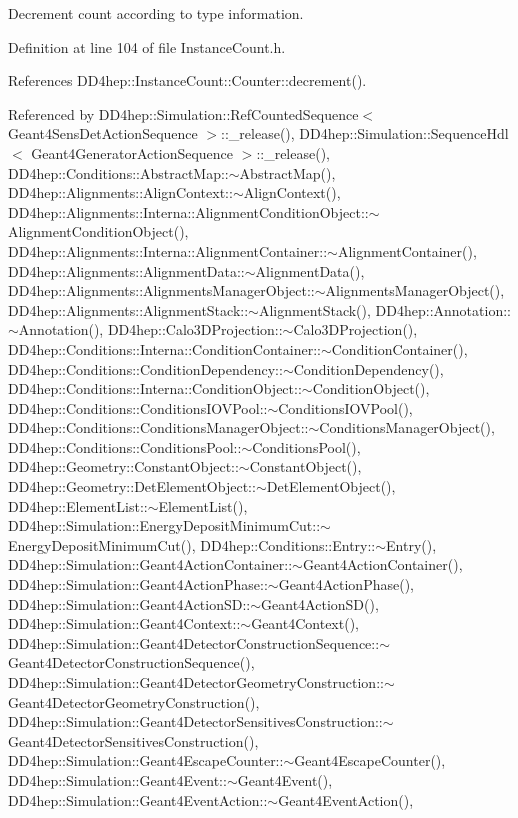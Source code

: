 Decrement count according to type information. 



Definition at line 104 of file Instance\+Count.\+h.



References D\+D4hep\+::\+Instance\+Count\+::\+Counter\+::decrement().



Referenced by D\+D4hep\+::\+Simulation\+::\+Ref\+Counted\+Sequence$<$ Geant4\+Sens\+Det\+Action\+Sequence $>$\+::\+\_\+release(), D\+D4hep\+::\+Simulation\+::\+Sequence\+Hdl$<$ Geant4\+Generator\+Action\+Sequence $>$\+::\+\_\+release(), D\+D4hep\+::\+Conditions\+::\+Abstract\+Map\+::$\sim$\+Abstract\+Map(), D\+D4hep\+::\+Alignments\+::\+Align\+Context\+::$\sim$\+Align\+Context(), D\+D4hep\+::\+Alignments\+::\+Interna\+::\+Alignment\+Condition\+Object\+::$\sim$\+Alignment\+Condition\+Object(), D\+D4hep\+::\+Alignments\+::\+Interna\+::\+Alignment\+Container\+::$\sim$\+Alignment\+Container(), D\+D4hep\+::\+Alignments\+::\+Alignment\+Data\+::$\sim$\+Alignment\+Data(), D\+D4hep\+::\+Alignments\+::\+Alignments\+Manager\+Object\+::$\sim$\+Alignments\+Manager\+Object(), D\+D4hep\+::\+Alignments\+::\+Alignment\+Stack\+::$\sim$\+Alignment\+Stack(), D\+D4hep\+::\+Annotation\+::$\sim$\+Annotation(), D\+D4hep\+::\+Calo3\+D\+Projection\+::$\sim$\+Calo3\+D\+Projection(), D\+D4hep\+::\+Conditions\+::\+Interna\+::\+Condition\+Container\+::$\sim$\+Condition\+Container(), D\+D4hep\+::\+Conditions\+::\+Condition\+Dependency\+::$\sim$\+Condition\+Dependency(), D\+D4hep\+::\+Conditions\+::\+Interna\+::\+Condition\+Object\+::$\sim$\+Condition\+Object(), D\+D4hep\+::\+Conditions\+::\+Conditions\+I\+O\+V\+Pool\+::$\sim$\+Conditions\+I\+O\+V\+Pool(), D\+D4hep\+::\+Conditions\+::\+Conditions\+Manager\+Object\+::$\sim$\+Conditions\+Manager\+Object(), D\+D4hep\+::\+Conditions\+::\+Conditions\+Pool\+::$\sim$\+Conditions\+Pool(), D\+D4hep\+::\+Geometry\+::\+Constant\+Object\+::$\sim$\+Constant\+Object(), D\+D4hep\+::\+Geometry\+::\+Det\+Element\+Object\+::$\sim$\+Det\+Element\+Object(), D\+D4hep\+::\+Element\+List\+::$\sim$\+Element\+List(), D\+D4hep\+::\+Simulation\+::\+Energy\+Deposit\+Minimum\+Cut\+::$\sim$\+Energy\+Deposit\+Minimum\+Cut(), D\+D4hep\+::\+Conditions\+::\+Entry\+::$\sim$\+Entry(), D\+D4hep\+::\+Simulation\+::\+Geant4\+Action\+Container\+::$\sim$\+Geant4\+Action\+Container(), D\+D4hep\+::\+Simulation\+::\+Geant4\+Action\+Phase\+::$\sim$\+Geant4\+Action\+Phase(), D\+D4hep\+::\+Simulation\+::\+Geant4\+Action\+S\+D\+::$\sim$\+Geant4\+Action\+S\+D(), D\+D4hep\+::\+Simulation\+::\+Geant4\+Context\+::$\sim$\+Geant4\+Context(), D\+D4hep\+::\+Simulation\+::\+Geant4\+Detector\+Construction\+Sequence\+::$\sim$\+Geant4\+Detector\+Construction\+Sequence(), D\+D4hep\+::\+Simulation\+::\+Geant4\+Detector\+Geometry\+Construction\+::$\sim$\+Geant4\+Detector\+Geometry\+Construction(), D\+D4hep\+::\+Simulation\+::\+Geant4\+Detector\+Sensitives\+Construction\+::$\sim$\+Geant4\+Detector\+Sensitives\+Construction(), D\+D4hep\+::\+Simulation\+::\+Geant4\+Escape\+Counter\+::$\sim$\+Geant4\+Escape\+Counter(), D\+D4hep\+::\+Simulation\+::\+Geant4\+Event\+::$\sim$\+Geant4\+Event(), D\+D4hep\+::\+Simulation\+::\+Geant4\+Event\+Action\+::$\sim$\+Geant4\+Event\+Action(), 